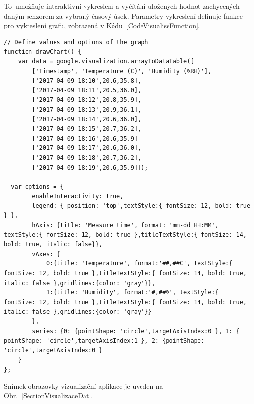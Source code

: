 To~umožňuje interaktivní vykreslení a vyčítání uložených hodnot zachycených daným senzorem za vybraný časový úsek. Parametry vykreslení definuje funkce pro vykreslení grafu, zobrazená v Kódu~\ref{CodeVisualiseFunction}.

\begin{lstlisting}[caption={Ukázka parametrizace vizualizovaných dat},captionpos=b,label=CodeVisualiseFunction,style=MyCodePython]
// Define values and options of the graph
function drawChart() {
	var data = google.visualization.arrayToDataTable([
		['Timestamp', 'Temperature (C)', 'Humidity (%RH)'],
		['2017-04-09 18:10',20.6,35.8],
		['2017-04-09 18:11',20.5,36.0],
		['2017-04-09 18:12',20.8,35.9],
		['2017-04-09 18:13',20.9,36.1],
		['2017-04-09 18:14',20.6,36.0],
		['2017-04-09 18:15',20.7,36.2],
		['2017-04-09 18:16',20.6,35.9]
		['2017-04-09 18:17',20.6,36.0],
		['2017-04-09 18:18',20.7,36.2],
		['2017-04-09 18:19',20.6,35.9]]);

  var options = { 
		enableInteractivity: true,
		legend: { position: 'top',textStyle:{ fontSize: 12, bold: true } },
		hAxis: {title: 'Measure time', format: 'mm-dd HH:MM', textStyle:{ fontSize: 12, bold: true },titleTextStyle:{ fontSize: 14, bold: true, italic: false}},
		vAxes: {
			0:{title: 'Temperature', format:'##,##C', textStyle:{ fontSize: 12, bold: true },titleTextStyle:{ fontSize: 14, bold: true, italic: false },gridlines:{color: 'gray'}},
			1:{title: 'Humidity', format:'#,##%', textStyle:{ fontSize: 12, bold: true },titleTextStyle:{ fontSize: 14, bold: true, italic: false },gridlines:{color: 'gray'}}
		},
		series: {0: {pointShape: 'circle',targetAxisIndex:0 }, 1: { pointShape: 'circle',targetAxisIndex:1 }, 2: {pointShape: 'circle',targetAxisIndex:0 }
	}          
};
\end{lstlisting}	

\newpage

Snímek obrazovky vizualizační aplikace je uveden na Obr.~\ref{SectionVisualizaceDat}.

